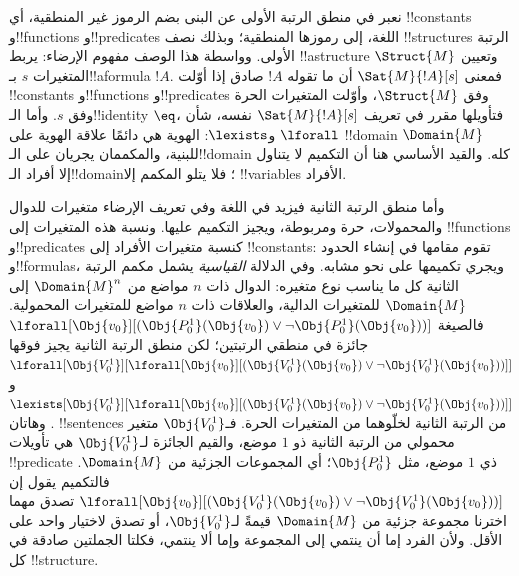 \documentclass[../../../include/open-logic-section]{subfiles}
\begin{document}


نعبر في منطق الرتبة الأولى عن البنى بضم الرموز غير المنطقية،
أي !!{constant}s و!!{function}s و!!{predicate}s اللغة، إلى
رموزها المنطقية؛ وبذلك نصف !!{structure}s الرتبة الأولى.
وواسطة هذا الوصف مفهوم الإرضاء: يربط !!a{structure}
$\Struct{M}$ وتعيين المتغيرات $s$ بـ!!a{formula} $!A$.
فمعنى $\Sat{M}{!A}[s]$ أن ما تقوله $!A$ صادق إذا أوّلت
!!{constant}s و!!{function}s و!!{predicate}s وفق $\Struct{M}$،
وأوّلت المتغيرات الحرة وفق $s$. وأما الـ!!{identity} $\eq$،
فتأويلها مقرر في تعريف $\Sat{M}{!A}[s]$ نفسه، شأن
$\lforall$ و$\lexists$: الهوية هي دائمًا علاقة الهوية على
!!{domain} $\Domain{M}$ للبنية، والمكممان يجريان على
الـ!!{domain} كله. والقيد الأساسي هنا أن التكميم لا يتناول إلا
أفراد الـ!!{domain}؛ فلا يتلو المكمم إلا !!{variable}s الأفراد.

وأما منطق الرتبة الثانية فيزيد في اللغة وفي تعريف الإرضاء
متغيرات للدوال والمحمولات، حرة ومربوطة، ويجيز التكميم عليها.
ونسبة هذه المتغيرات إلى !!{function}s و!!{predicate}s كنسبة
متغيرات الأفراد إلى !!{constant}s: تقوم مقامها في إنشاء الحدود
و!!{formula}s، ويجري تكميمها على نحو مشابه.
وفي الدلالة \emph{القياسية} يشمل مكمم الرتبة الثانية كل ما
يناسب نوع متغيره: الدوال ذات $n$ مواضع من $\Domain{M}^n$
إلى $\Domain{M}$ للمتغيرات الدالية، والعلاقات ذات $n$ مواضع
للمتغيرات المحمولية. فالصيغة
$\lforall[\Obj{v_0}][(\Obj{P^1_0}(\Obj{v_0}) \lor \lnot
  \Obj{P^1_0}(\Obj{v_0}))]$ جائزة في منطقي الرتبتين؛
لكن منطق الرتبة الثانية يجيز فوقها
$\lforall[\Obj{V^1_0}][\lforall[\Obj{v_0}][(\Obj{V^1_0}(\Obj{v_0}) \lor
    \lnot \Obj{V^1_0}(\Obj{v_0}))]]$ و
$\lexists[\Obj{V^1_0}][\lforall[\Obj{v_0}][(\Obj{V^1_0}(\Obj{v_0}) \lor
    \lnot \Obj{V^1_0}(\Obj{v_0}))]]$.
وهاتان !!{sentence}s من الرتبة الثانية لخلّوهما من المتغيرات
الحرة. فـ$\Obj{V^1_0}$ متغير محمولي من الرتبة الثانية ذو $1$
موضع، والقيم الجائزة لـ$\Obj{V^1_0}$ هي تأويلات
!!{predicate} ذي $1$ موضع، مثل $\Obj{P^1_0}$؛ أي المجموعات
الجزئية من $\Domain{M}$. فالتكميم يقول إن
$\lforall[\Obj{v_0}][(\Obj{V^1_0}(\Obj{v_0}) \lor \lnot
  \Obj{V^1_0}(\Obj{v_0}))]$ تصدق مهما اخترنا مجموعة جزئية من
$\Domain{M}$ قيمةً لـ$\Obj{V^1_0}$، أو تصدق لاختيار واحد
على الأقل. ولأن الفرد إما أن ينتمي إلى المجموعة وإما ألا ينتمي،
فكلتا الجملتين صادقة في كل !!{structure}.
\end{document}
